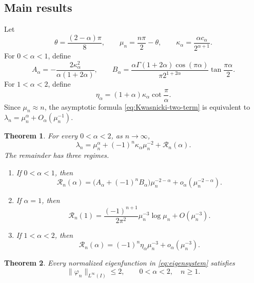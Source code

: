 \documentclass[11pt]{amsart}
\numberwithin{equation}{section}
\newtheorem{theorem}{Theorem}[section]
\theoremstyle{remark}
\newcommand{\norm}[2][]{\lVert #2\rVert_{#1}}
\begin{document}
\subsection{Main results}
Let
\begin{equation}\label{eq:parameters}
 \theta=\frac{(2-\alpha)\pi}{8},
 \qquad
 \mu_n=\frac{n\pi}{2}-\theta,
 \qquad
 \kappa_\alpha=\frac{\alpha c_\alpha}{2^{\alpha+1}}.
\end{equation}
For $0<\alpha<1$, define
\begin{equation}\label{eq:A-alpha}
 A_\alpha=-\frac{2\kappa_\alpha^2}{\alpha(1+2\alpha)},\qquad  B_\alpha=
 \frac{\alpha\Gamma(1+2\alpha)\cos(\pi\alpha)}
 {\pi2^{1+2\alpha}}\tan\frac{\pi\alpha}2.
\end{equation}
For $1<\alpha<2$, define
\begin{equation}\label{eq:eta}
 \eta_\alpha=(1+\alpha)\kappa_\alpha\cot\frac{\pi}{\alpha}.
\end{equation}
Since $\mu_n\approx n$, the asymptotic formula \eqref{eq:Kwasnicki-two-term} is equivalent to
$\lambda_n=\mu_n^\alpha+O_\alpha(\mu_n^{-1})$. 
\begin{theorem}\label{thm1}
For every $0<\alpha<2$, as $n\to\infty$,
\[
 \lambda_n=\mu_n^\alpha
 +(-1)^n\kappa_\alpha\mu_n^{-2}+\mathcal R_n(\alpha).
\]
The remainder has three regimes.
\begin{enumerate}[label=\textup{(\roman*)},leftmargin=2.2em]
\item If $0<\alpha<1$, then
\begin{equation}\label{eq:main-small}
 \mathcal R_n(\alpha)
 =\bigl(A_\alpha+(-1)^nB_\alpha\bigr)\mu_n^{-2-\alpha}
 +o_\alpha(\mu_n^{-2-\alpha}).
\end{equation}
\item If $\alpha=1$, then
\begin{equation}\label{eq:main-critical}
 \mathcal R_n(1)
 =\frac{(-1)^{n+1}}{2\pi^2}\mu_n^{-3}\log\mu_n
 +O(\mu_n^{-3}).
\end{equation}
\item If $1<\alpha<2$, then
\begin{equation}\label{eq:main-large}
 \mathcal R_n(\alpha)
 =(-1)^n\eta_\alpha\mu_n^{-3}+o_\alpha(\mu_n^{-3}).
\end{equation}
\end{enumerate}
\end{theorem}

\begin{theorem}\label{thm2}
Every normalized eigenfunction in \eqref{eq:eigensystem} satisfies
\begin{equation}\label{eq:main-Linfty}
 \norm[L^\infty(I)]{\varphi_n}\le2,
 \qquad 0<\alpha<2,\quad n\ge1.
\end{equation}
\end{theorem}
\end{document}
